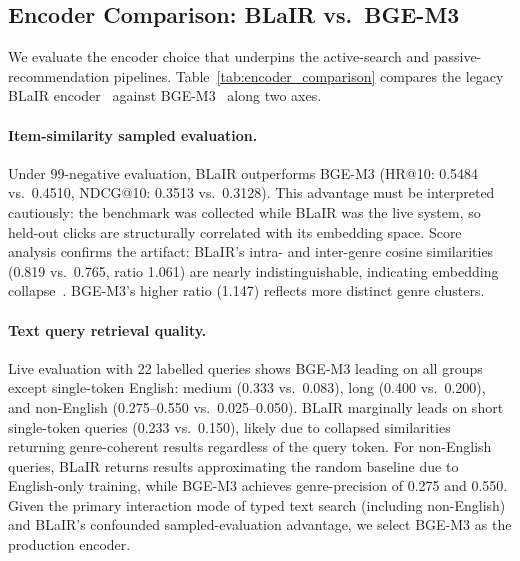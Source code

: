 \subsection{Encoder Comparison: BLaIR vs.\ BGE-M3}
\label{ssec:encoder}

We evaluate the encoder choice that underpins the active-search and
passive-recommendation pipelines.
Table~\ref{tab:encoder_comparison} compares the legacy BLaIR
encoder~\cite{hou2024amazon} against BGE-M3~\cite{chen2024bgem3} along two axes.


\paragraph{Item-similarity sampled evaluation.}
Under 99-negative evaluation, BLaIR outperforms BGE-M3 (HR@10: 0.5484
vs.\ 0.4510, NDCG@10: 0.3513 vs.\ 0.3128). This advantage must be
interpreted cautiously: the benchmark was collected while BLaIR was the
live system, so held-out clicks are structurally correlated with its
embedding space.
Score analysis confirms the artifact: BLaIR's intra- and inter-genre
cosine similarities (0.819 vs.\ 0.765, ratio 1.061) are nearly
indistinguishable, indicating embedding collapse~\cite{gao2021simcse}. BGE-M3's higher ratio
(1.147) reflects more distinct genre clusters.

\paragraph{Text query retrieval quality.}
Live evaluation with 22 labelled queries shows BGE-M3 leading on all
groups except single-token English: medium (0.333 vs.\ 0.083), long
(0.400 vs.\ 0.200), and non-English (0.275--0.550 vs.\ 0.025--0.050).
BLaIR marginally leads on short single-token queries (0.233 vs.\ 0.150),
likely due to collapsed similarities returning genre-coherent results
regardless of the query token.
For non-English queries, BLaIR returns results approximating the random baseline due to
English-only training, while BGE-M3 achieves genre-precision of 0.275
and 0.550.
Given the primary interaction mode of typed text search (including
non-English) and BLaIR's confounded sampled-evaluation advantage, we
select BGE-M3 as the production encoder.
